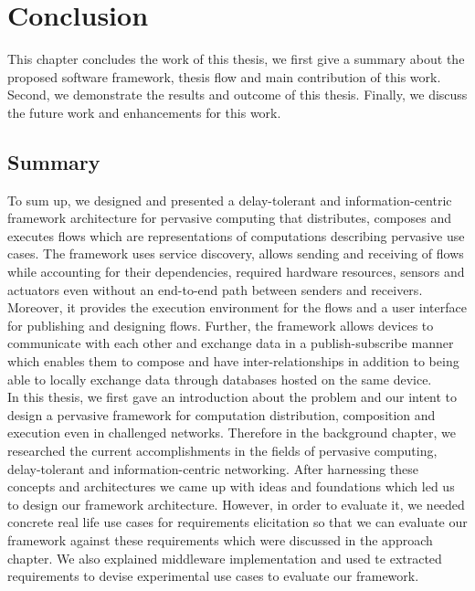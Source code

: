 
\chapter{Conclusion}\label{chapter:conclusion}

This chapter concludes the work of this thesis, we first give a summary about the proposed software framework,  thesis flow and  main contribution of this work. Second, we demonstrate the results and  outcome of this thesis. Finally, we discuss the future work and enhancements for  this work. 

\section{Summary}
To sum up, we designed and presented a delay-tolerant and information-centric framework architecture for pervasive computing  that distributes, composes and executes flows which are representations of computations describing pervasive use cases. The framework uses  service discovery, allows sending and receiving of flows while accounting for their dependencies, required hardware resources, sensors and actuators even without an end-to-end path between senders and receivers. Moreover, it provides the execution environment for the flows and a user interface for publishing and designing flows. Further, the framework allows devices to communicate with each other and exchange data in a publish-subscribe manner which enables them to compose and have inter-relationships in addition to  being able to locally exchange data through databases hosted on the same device. \\

\noindent In this thesis, we first gave an introduction about the problem and our intent to design a pervasive framework for computation distribution, composition and execution even in challenged networks. Therefore in the background chapter, we researched the current accomplishments in the fields of pervasive computing, delay-tolerant and information-centric networking. After harnessing these concepts and architectures we came up with ideas and foundations which led us to design our framework architecture. However, in order to evaluate it, we needed concrete real life use cases for  requirements elicitation so that we can evaluate our framework against these requirements which were discussed in the approach chapter. We also explained middleware implementation and used te extracted requirements to devise experimental use cases to evaluate our framework.\\

